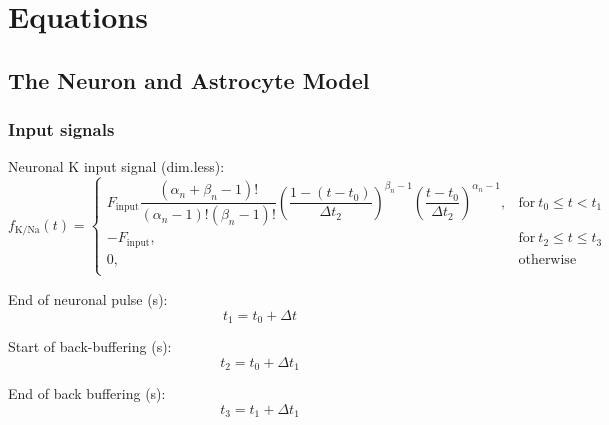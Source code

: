 \section{Equations}\label{sec:equations}

\subsection{The Neuron and Astrocyte Model}

\subsubsection*{Input signals} \label{sec:InputSignal}

Neuronal \gls{K} input signal (dim.less):
\begin{equation}
f_{\text{K/Na}}(t) = 
	\begin{cases} 
		F_{\text{input}} \dfrac{(\alpha_n + \beta_n-1)!}{(\alpha_n-1)!(\beta_n-1)!} \left( \dfrac{1-(t-t_{0})}{\Delta t_2}\right) ^{\beta_n -1} \left( \dfrac{t-t_{0}}{\Delta t_2}\right) ^{\alpha_n -1}, & \text{for}\: t_{0} \leq t < t_{1} \\
		-F_{\text{input}}, & \text{for}\: t_{2} \leq t \leq t_{3} \\	
		0, & \text{otherwise}\\	
	\end{cases} 
\end{equation}

End of neuronal pulse (s):
\begin{equation}
	t_{1} = t_{0} + \Delta t
\end{equation}

Start of back-buffering (s):
\begin{equation}
	t_{2} = t_{0} + \Delta t_1
\end{equation}

End of back buffering (s):
\begin{equation}
	t_{3} = t_{1} + \Delta t_1
\end{equation}


